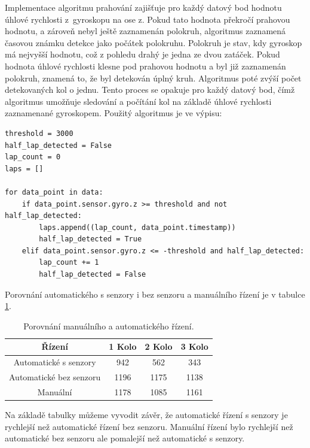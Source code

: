 Implementace algoritmu prahování zajišťuje pro každý datový bod hodnotu úhlové
rychlosti z~gyroskopu na ose z. Pokud tato hodnota překročí prahovou hodnotu, a
zároveň nebyl ještě zaznamenán polokruh, algoritmus zaznamená časovou známku detekce
jako počátek polokruhu. Polokruh je stav, kdy gyroskop má nejvyšší hodnotu, což z pohledu drahý je jedna ze dvou zatáček. Pokud hodnota úhlové rychlosti klesne pod prahovou hodnotu a
byl již zaznamenán polokruh, znamená to, že byl detekován úplný kruh. Algoritmus
poté zvýší počet detekovaných kol o jednu. Tento proces se opakuje pro každý datový
bod, čímž algoritmus umožňuje sledování a počítání kol na základě úhlové rychlosti
zaznamenané gyroskopem. Použitý algoritmus je ve výpisu:
\begin{lstlisting}[caption = Počet kol, label = lst:countLap]
threshold = 3000
half_lap_detected = False
lap_count = 0
laps = []

for data_point in data:
    if data_point.sensor.gyro.z >= threshold and not half_lap_detected:
        laps.append((lap_count, data_point.timestamp))
        half_lap_detected = True
    elif data_point.sensor.gyro.z <= -threshold and half_lap_detected:
        lap_count += 1
        half_lap_detected = False
\end{lstlisting}

Porovnání automatického s senzory i bez senzoru a manuálního řízení je v tabulce \ref{tab:Comparison}.
\begin{table}[!h]
    \centering
    \begin{tabular}{cccc}
        \hline
        \textbf{Řízení} & \textbf{1 Kolo} & \textbf{2 Kolo} & \textbf{3 Kolo} \\
        \hline
        Automatické s senzory          & 942       & 562 & 343          \\
        Automatické bez senzoru & 1196 & 1175 & 1138 \\
        Manuální 			  & 1178       & 1085 & 1161           \\
        \hline
    \end{tabular}
    \caption{Porovnání manuálního a automatického řízení.}
    \label{tab:Comparison}
\end{table}

Na základě tabulky můžeme vyvodit závěr, že automatické řízení s senzory je rychlejší než automatické řízení bez senzoru. Manuální řízení bylo rychlejší než automatické bez senzoru ale pomalejší než automatické s senzory.
\endinput
